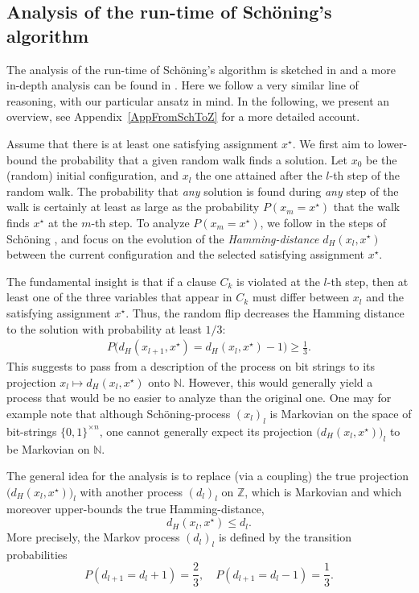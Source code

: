 \documentclass[a4paper,aps,floatfix]{revtex4}
\begin{document}
\subsection{\label{SettingStageRunTime} Analysis of the run-time of Sch\"oning's algorithm}

The analysis of the run-time of Sch\"oning's algorithm is sketched in \cite{Schoening99,SchoeningToranBook} and a more in-depth analysis can be found in \cite{SwissPhDThesis}. 
Here we follow a very similar line of reasoning, with our particular ansatz in mind. 
In the following, we present an overview, see Appendix~\ref{AppFromSchToZ} for a more detailed account.

Assume that there is at least one satisfying assignment $x^\star$.
We first aim to lower-bound the probability that a given random walk finds a solution.
Let $x_0$ be the (random) initial configuration, and $x_l$ the one attained after the $l$-th step of the random walk.
The probability that \emph{any} solution is found during \emph{any} step of the walk is certainly at least as large as the probability $P(x_m = x^\star)$ that the walk finds $x^\star$ at the $m$-th step.
To analyze $P(x_m=x^\star)$, we follow in the steps of Sch\"oning \cite{Schoening99,SchoeningToranBook}, and focus on the evolution of the \emph{Hamming-distance} $d_H(x_l, x^\star)$ between the current configuration and the selected satisfying assignment $x^\star$. 

The fundamental insight is that if a clause $C_k$ is violated at the $l$-th step, then at least one of the three variables that appear in $C_k$ must differ between $x_l$ and the satisfying assignment $x^\star$.
Thus, the random flip decreases the Hamming distance to the solution with probability at least $1/3$:
\begin{align}\label{eqn:schoening_improvement}
	P\big( d_H(x_{l+1}, x^\star) = d_H(x_l, x^\star) - 1 \big)\geq \frac13.
\end{align}
This suggests to pass from a description of the process on bit strings to its projection
$x_l \mapsto d_H(x_l,x^\star)$ 
onto $\mathbb{N}$.
However, this would generally yield a process that would be no easier to analyze than the original one. 
One may for example note that although Sch\"oning-process  $(x_l)_l$ is Markovian on the space of bit-strings $\{0,1\}^{\times n}$, one cannot generally expect its projection $\big(d_H(x_l,x^\star)\big)_l$ to be Markovian on $\mathbb{N}$. 

The general idea for the analysis is to replace (via a coupling) the true projection $\big(d_H(x_l,x^\star)\big)_l$ with another process $(d_l)_l$ on $\mathbb{Z}$, which is Markovian and which moreover upper-bounds the true Hamming-distance,
\begin{equation}
	\label{FundamentalBound}
	d_H(x_l,x^\star)\leq d_l.
\end{equation}
More precisely, the Markov process $(d_l)_l$ is defined by the transition probabilities 
\begin{equation}
	\label{TransitionProbabilities}
	P(d_{l+1} = d_l +1) = \frac{2}{3},\quad P(d_{l+1} = d_l -1) = \frac{1}{3}.
\end{equation}
\end{document}
